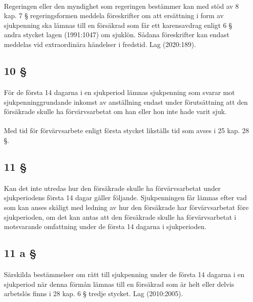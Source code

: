 \documentclass[a4paper,notitlepage,openany,10pt]{book}
\begin{document}
\paragraph*{}
Regeringen eller den myndighet som regeringen bestämmer kan med stöd av 8 kap. 7 § regeringsformen meddela föreskrifter om att ersättning i form av sjukpenning ska lämnas till en försäkrad som får ett karensavdrag enligt 6 § andra stycket lagen (1991:1047) om sjuklön. Sådana föreskrifter kan endast meddelas vid extraordinära händelser i fredstid.
Lag (2020:189).
\subsection*{10 §}
\paragraph*{}
För de första 14 dagarna i en sjukperiod lämnas sjukpenning som svarar mot sjukpenninggrundande inkomst av anställning endast under förutsättning att den försäkrade skulle ha förvärvsarbetat om han eller hon inte hade varit sjuk.
\paragraph*{}
Med tid för förvärvsarbete enligt första stycket likställs tid som avses i 25 kap. 28 §.
\subsection*{11 §}
\paragraph*{}
Kan det inte utredas hur den försäkrade skulle ha förvärvsarbetat under sjukperiodens första 14 dagar gäller följande. Sjukpenningen får lämnas efter vad som kan anses skäligt med ledning av hur den försäkrade har förvärvsarbetat före sjukperioden, om det kan antas att den försäkrade skulle ha förvärvsarbetat i motsvarande omfattning under de första 14 dagarna i sjukperioden.
\subsection*{11 a §}
\paragraph*{}
Särskilda bestämmelser om rätt till sjukpenning under de första 14 dagarna i en sjukperiod när denna förmån lämnas till en försäkrad som är helt eller delvis arbetslös finns i 28 kap. 6 § tredje stycket.
Lag (2010:2005).
\end{document}
